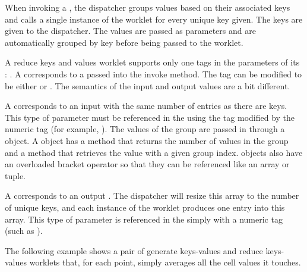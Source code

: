When invoking a , the dispatcher groups
values based on their associated keys and calls a single instance of the
worklet for every unique key given. The keys are given to the
dispatcher. The values are passed as parameters and are automatically
grouped by key before being passed to the worklet.

A reduce keys and values worklet supports only one tags in the parameters
of its \controlsignature: . A  corresponds to a
 passed into the invoke method. The  tag
can be modified to be either  or . The semantics of
the input and output values are a bit different.

A  corresponds to an input  with
the same number of entries as there are keys. This type of parameter must
be referenced in the \executionsignature using the  tag
modified by the numeric tag (for example, ). The
values of the group are passed in through a  object. A
 object has a  method
that returns the number of values in the group and a  method
that retrieves the value with a given group
index.  objects also have an overloaded bracket
operator so that they can be referenced like an array or tuple.

A  corresponds to an output
. The dispatcher will resize this array to the number
of unique keys, and each instance of the worklet produces one entry into
this array. This type of parameter is referenced in the \executionsignature
simply with a numeric tag (such as ).

The following example shows a pair of generate keys-values and reduce
keys-values worklets that, for each point, simply averages all the cell
values it touches.

